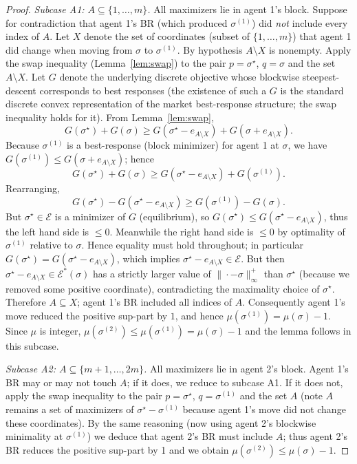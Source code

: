 \documentclass[11pt]{article}
\begin{document}
\begin{proof}
\smallskip\noindent\emph{Subcase A1: \(A\subseteq\{1,\dots,m\}\).}
All maximizers lie in agent 1's block. Suppose for contradiction that
agent 1's BR (which produced \(\sigma^{(1)}\)) did \emph{not} include
every index of \(A\). Let \(X\) denote the set of coordinates (subset
of \(\{1,\dots,m\}\)) that agent 1 did change when moving from
\(\sigma\) to \(\sigma^{(1)}\). By hypothesis \(A\setminus X\) is
nonempty. Apply the swap inequality (Lemma~\ref{lem:swap}) to the
pair \(p=\sigma^\star\), \(q=\sigma\) and the set \(A\setminus X\).
Let \(G\) denote the underlying discrete objective whose blockwise
steepest-descent corresponds to best responses (the existence of
such a \(G\) is the standard discrete convex representation of the
market best-response structure; the swap inequality holds for it).
From Lemma~\ref{lem:swap},
\[
G(\sigma^\star)+G(\sigma) \ge G(\sigma^\star - e_{A\setminus X}) + 
G(\sigma + e_{A\setminus X}).
\]
Because \(\sigma^{(1)}\) is a best-response (block minimizer) for
agent 1 at \(\sigma\), we have \(G(\sigma^{(1)})\le G(\sigma+e_{A\setminus X})\);
hence
\[
G(\sigma^\star)+G(\sigma) \ge G(\sigma^\star - e_{A\setminus X}) + 
G(\sigma^{(1)}).
\]
Rearranging,
\[
G(\sigma^\star) - G(\sigma^\star - e_{A\setminus X}) \ge 
G(\sigma^{(1)}) - G(\sigma).
\]
But \(\sigma^\star\in\mathcal E\) is a minimizer of \(G\) (equilibrium),
so \(G(\sigma^\star)\le G(\sigma^\star - e_{A\setminus X})\), thus the
left hand side is \(\le0\). Meanwhile the right hand side is
\(\le0\) by optimality of \(\sigma^{(1)}\) relative to \(\sigma\).
Hence equality must hold throughout; in particular
\(G(\sigma^\star) = G(\sigma^\star - e_{A\setminus X})\), which implies
\(\sigma^\star - e_{A\setminus X}\in\mathcal E\). But then
\(\sigma^\star - e_{A\setminus X}\in\mathcal E^*(\sigma)\) has a
strictly larger value of \(\|\cdot-\sigma\|_\infty^+\) than
\(\sigma^\star\) (because we removed some positive coordinate), contradicting
the maximality choice of \(\sigma^\star\). Therefore \(A\subseteq X\);
agent 1's BR included all indices of \(A\). Consequently agent 1's move
reduced the positive sup-part by \(1\), and hence
\(\mu(\sigma^{(1)})=\mu(\sigma)-1\). Since \(\mu\) is integer,
\(\mu(\sigma^{(2)})\le\mu(\sigma^{(1)})=\mu(\sigma)-1\) and the lemma follows
in this subcase.

\smallskip\noindent\emph{Subcase A2: \(A\subseteq\{m+1,\dots,2m\}\).}
All maximizers lie in agent 2's block. Agent 1's BR may or may not
touch \(A\); if it does, we reduce to subcase A1. If it does not,
apply the swap inequality to the pair \(p=\sigma^\star\), \(q=\sigma^{(1)}\)
and the set \(A\) (note \(A\) remains a set of maximizers of
\(\sigma^\star - \sigma^{(1)}\) because agent 1's move did not change
these coordinates). By the same reasoning (now using agent 2's
blockwise minimality at \(\sigma^{(1)}\)) we deduce that agent 2's BR
must include \(A\); thus agent 2's BR reduces the positive sup-part
by 1 and we obtain \(\mu(\sigma^{(2)})\le\mu(\sigma)-1\).


\end{proof}
\end{document}
